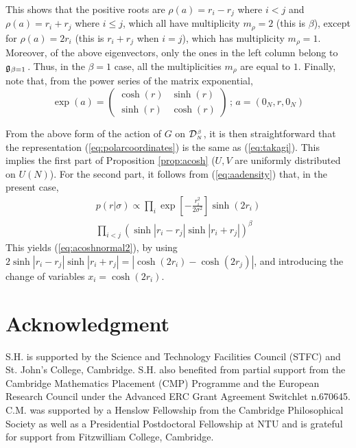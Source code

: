 \documentclass[draftclsnofoot]{IEEEtran}
\begin{document}
This shows that the positive roots are $\rho(a) = r_i - r_j$ where $i < j$ and $\rho(a) = r_i + r_j$ where $i \leq j$, which all have multiplicity $m_\rho = 2 $ (this is $\beta$), except for $\rho(a) = 2r_i$ (this is $r_i + r_j$ when $i = j$), which has multiplicity $m_\rho = 1$. Moreover, of the above eigenvectors, only the ones in the left column belong to $\mathfrak{g}_{\hspace{0.02cm}\beta = 1}\hspace{0.03cm}$. Thus, in the $\beta = 1$ case, all the multiplicities $m_\rho$ are equal to $1$. Finally, note that, from the power series of the matrix exponential,
\begin{equation} 
\exp(a) = \left(\begin{array}{cc} \cosh(r) & \sinh(r) \\ \sinh(r) & \cosh(r) \end{array}\right) \,;\, a = (\mathrm{0}_{\scriptscriptstyle N},r,\mathrm{0}_{\scriptscriptstyle N})
\end{equation}

\noindent From the above form of the action of $G$ on $\mathcal{D}^{\hspace{0.02cm}\scriptscriptstyle \beta}_{\scriptscriptstyle N\hspace{0.02cm}}$, it is then straightforward that the representation (\ref{eq:polarcoordinates}) is the same as (\ref{eq:takagi}). This implies the first part of Proposition \ref{prop:acosh} ($U, V$ are uniformly distributed on $U(N)$). For the second part, it follows from (\ref{eq:aadensity}) that, in the present case,
\begin{align}
\nonumber p(r|\sigma) \propto \prod_{i} \exp\left[-\frac{r^{\scriptscriptstyle 2}_i}{2\sigma^{\scriptscriptstyle 2}}\right]\sinh(2r_i)\\
 \prod_{i<j} \left(\sinh\left|r_i-r_j\right|\sinh\left|r_i+r_j\right|\right)^\beta
\end{align}
This yields (\ref{eq:acoshnormal2}), by using $2\sinh\left|r_i-r_j\right|\sinh\left|r_i+r_j\right| = |\cosh(2r_i) - \cosh(2r_j)|$, and introducing the change of variables $x_i = \cosh(2r_i)$. 
    
\vfill
\pagebreak

\section*{Acknowledgment}
S.H. is supported by the Science and Technology Facilities Council (STFC) and St. John's College, Cambridge. S.H. also benefited from partial support from the Cambridge Mathematics Placement (CMP) Programme and the European Research Council under the Advanced ERC Grant Agreement Switchlet n.670645. C.M.
was supported by a Henslow Fellowship from the Cambridge Philosophical Society as well as a Presidential Postdoctoral Fellowship at NTU and is grateful for support from Fitzwilliam College, Cambridge.
\end{document}
